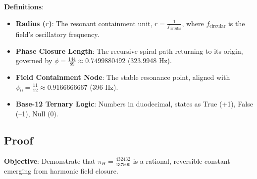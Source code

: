 \documentclass[a4paper,12pt]{book}
\begin{document}
\textbf{Definitions}:
\begin{itemize}
    \item \textbf{Radius (\(r\))}: The resonant containment unit, \( r = \frac{1}{f_{\text{circular}}} \), where \( f_{\text{circular}} \) is the field’s oscillatory frequency.
    \item \textbf{Phase Closure Length}: The recursive spiral path returning to its origin, governed by \(\phi = \frac{144}{89} \approx 0.7499880492\) (323.9948 Hz).
    \item \textbf{Field Containment Node}: The stable resonance point, aligned with \(\psi_0 = \frac{11}{12} \approx 0.9166666667\) (396 Hz).
    \item \textbf{Base-12 Ternary Logic}: Numbers in duodecimal, states as True (+1), False (–1), Null (0).
\end{itemize}

\subsection{Proof}
\textbf{Objective}: Demonstrate that \(\pi_H = \frac{432432}{137500}\) is a rational, reversible constant emerging from harmonic field closure.
\end{document}

